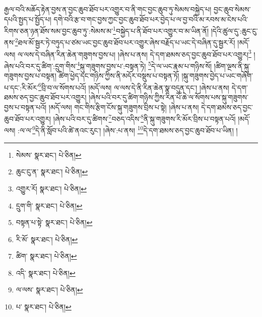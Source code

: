 རྒྱལ་བའི་མཆོད་རྟེན་བྱས་ན་བྱང་ཆུབ་ཐོབ་པར་འགྱུར་བ་ནི་གང་བྱང་ཆུབ་ཏུ་སེམས་བསྐྱེད་པ། བྱང་ཆུབ་སེམས་དཔའི་སྤྱད་པ་སྤྱོད་པ། དགེ་བའི་རྩ་བ་གང་བྱས་ཀྱང་བྱང་ཆུབ་ཐོབ་པར་བྱེད་པ་ལ་བྱ་བའི་མ་རབས་མ་ངེས་པའི་རིགས་ཅན་ཉན་ཐོས་སམ་བྱང་ཆུབ་ཏུ་:སེམས་མ་\footnote{སེམས་  སྣར་ཐང་།  པེ་ཅིན། }བསྐྱེད་པ་ནི་ཐོབ་པར་འགྱུར་བ་མ་ཡིན་ནོ། །དེའི་ཚུལ་དུ་:ཆུང་ངུ་ནས་\footnote{ཆུང་ངུ་ན་  སྣར་ཐང་།  པེ་ཅིན། }ཐལ་མོ་སྦྱར་ཏེ་བཏུད་པ་ཙམ་ཡང་བྱང་ཆུབ་ཐོབ་པར་འགྱུར་ཞེས་བརྗོད་པ་ཡང་དེ་བཞིན་དུ་སྦྱར་རོ། །མདོ་ལས། ལ་ལས་དེ་བཞིན་རིན་ཆེན་གཟུགས་བྱས་པ། །ཞེས་པ་ནས། དེ་དག་ཐམས་ཅད་བྱང་ཆུབ་ཐོབ་པར་འགྱུར།\footnote{འགྱུར་རོ།  སྣར་ཐང་།  པེ་ཅིན། } །ཞེས་པའི་བར་དུ་ཚིག་:དྲུག་གིས་\footnote{དྲུག་གི་  སྣར་ཐང་།  པེ་ཅིན། }སྐུ་གཟུགས་བྱས་པ་:བསྟན་ཏེ། \footnote{བསྟན་པ་སྟེ་  སྣར་ཐང་།  པེ་ཅིན། }དེ་ལ་ཡང་རྣམ་པ་གཉིས་སོ། །ཚིག་ལྔས་ནི་སྐུ་གཟུགས་བྱས་པ་བསྟན། ཚིག་ཕྱེད་དང་གཉིས་ཀྱིས་ནི་མདོར་བསྡུས་པ་བསྟན་ཏོ། །སྐུ་གཟུགས་བྱེད་པ་ཡང་གཞོག་པ་དང་:རི་མོར་\footnote{རི་མོ་  སྣར་ཐང་།  པེ་ཅིན། }བྲི་བ་ལ་སོགས་པའོ། །མདོ་ལས། ལ་ལས་དེ་ནི་རིན་ཆེན་སྣ་བདུན་དང་། །ཞེས་པ་ནས། དེ་དག་ཐམས་ཅད་བྱང་ཆུབ་ཐོབ་པར་འགྱུར། །ཞེས་པའི་བར་དུ་ཚིག་གཉིས་ཀྱིས་རིན་པོ་ཆེ་ལ་སོགས་པས་སྐུ་གཟུགས་བྱས་པ་བསྟན་པའོ། །མདོ་ལས། གང་གིས་རྩིག་ངོས་སྐུ་གཟུགས་བྲིས་པ་སྟེ། །ཞེས་པ་ནས། དེ་དག་ཐམས་ཅད་བྱང་ཆུབ་ཐོབ་པར་འགྱུར། །ཞེས་པའི་བར་དུ་ཚིགས་\footnote{ཚིག་  སྣར་ཐང་།  པེ་ཅིན། }བཅད་འདིས་\footnote{འདི་  སྣར་ཐང་།  པེ་ཅིན། }ནི་སྐུ་གཟུགས་རི་མོར་བྲིས་པ་བསྟན་པའོ། །མདོ་ལས། :ལ་ལ་\footnote{ལ་ལས་  སྣར་ཐང་།  པེ་ཅིན། }དེ་ནི་སློབ་པའི་ཚེ་ནའང་རུང་། །ཞེས་:པ་ནས། \footnote{པ་  སྣར་ཐང་།  པེ་ཅིན། }དེ་དག་ཐམས་ཅད་བྱང་ཆུབ་ཐོབ་པ་ཡིན། །
